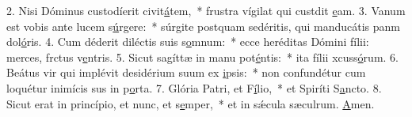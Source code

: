 2. Nisi Dóminus custodíerit civit\uline{á}tem,~* frustra vígilat qui custdit \uline{e}am.
3. Vanum est vobis ante lucem s\uline{ú}rgere:~* súrgite postquam sedéritis, qui manducátis panm dol\uline{ó}ris.
4. Cum déderit diléctis suis s\uline{o}mnum:~* ecce heréditas Dómini fílii: merces, frctus v\uline{e}ntris.
5. Sicut sagíttæ in manu pot\uline{é}ntis:~* ita fílii xcuss\uline{ó}rum.
6. Beátus vir qui implévit desidérium suum ex \uline{i}psis:~* non confundétur cum loquétur inimícis sus in p\uline{o}rta.
7. Glória Patri, et F\uline{í}lio,~* et Spiríti S\uline{a}ncto.
8. Sicut erat in princípio, et nunc, et s\uline{e}mper,~* et in sǽcula sæculrum. \uline{A}men.
